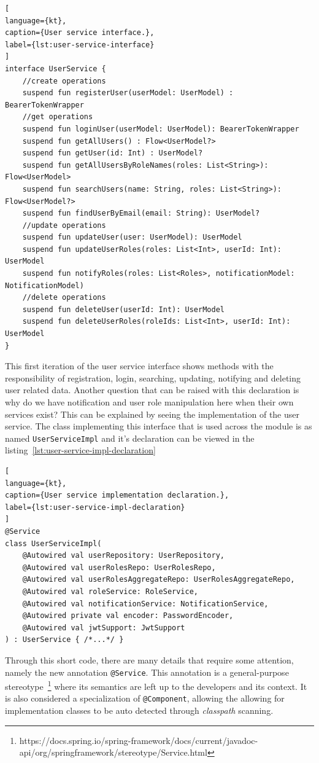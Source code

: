 \begin{lstlisting}[
language={kt},
caption={User service interface.},
label={lst:user-service-interface}
]
interface UserService {
    //create operations
    suspend fun registerUser(userModel: UserModel) : BearerTokenWrapper
    //get operations
    suspend fun loginUser(userModel: UserModel): BearerTokenWrapper
    suspend fun getAllUsers() : Flow<UserModel?>
    suspend fun getUser(id: Int) : UserModel?
    suspend fun getAllUsersByRoleNames(roles: List<String>): Flow<UserModel>
    suspend fun searchUsers(name: String, roles: List<String>): Flow<UserModel?>
    suspend fun findUserByEmail(email: String): UserModel?
    //update operations
    suspend fun updateUser(user: UserModel): UserModel
    suspend fun updateUserRoles(roles: List<Int>, userId: Int): UserModel
    suspend fun notifyRoles(roles: List<Roles>, notificationModel: NotificationModel)
    //delete operations
    suspend fun deleteUser(userId: Int): UserModel
    suspend fun deleteUserRoles(roleIds: List<Int>, userId: Int): UserModel
}
\end{lstlisting}

This first iteration of the user service interface shows methods with the responsibility of registration, login, searching, updating, notifying and deleting user related data.
Another question that can be raised with this declaration is why do we have notification and user role manipulation here when their own services exist? This can be explained by seeing the implementation of the user service. The class implementing this interface that is used across the module is as named \lstinline{UserServiceImpl} and it's declaration can be viewed in the listing~\ref{lst:user-service-impl-declaration}

\begin{lstlisting}[
language={kt},
caption={User service implementation declaration.},
label={lst:user-service-impl-declaration}
]
@Service
class UserServiceImpl(
    @Autowired val userRepository: UserRepository,
    @Autowired val userRolesRepo: UserRolesRepo,
    @Autowired val userRolesAggregateRepo: UserRolesAggregateRepo,
    @Autowired val roleService: RoleService,
    @Autowired val notificationService: NotificationService,
    @Autowired private val encoder: PasswordEncoder,
    @Autowired val jwtSupport: JwtSupport
) : UserService { /*...*/ }
\end{lstlisting}

Through this short code, there are many details that require some attention, namely the new annotation \lstinline{@Service}. This annotation is a general-purpose stereotype~\footnote{https://docs.spring.io/spring-framework/docs/current/javadoc-api/org/springframework/stereotype/Service.html}\label{fn:spring-service-stereotype} where its semantics are left up to the developers and its context. It is also considered a specialization of \lstinline{@Component}, allowing the allowing for implementation classes to be auto detected through \textit{classpath} scanning. 

